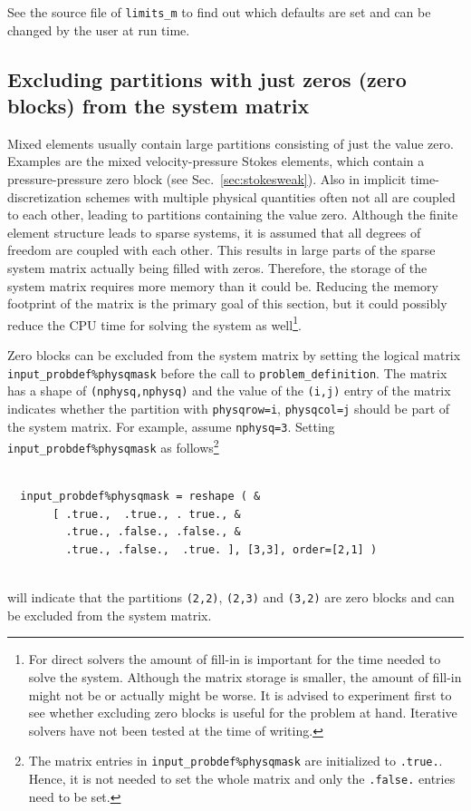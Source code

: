 See the source
file of \texttt{limits\_m} to find out which defaults are set and can be
changed by the user at run time.

\subsection{Excluding partitions with just zeros (zero blocks) from the system matrix}
\label{sec:excludezeroblocks}

Mixed elements usually contain large partitions consisting of just the value zero. Examples are the mixed velocity-pressure Stokes elements, which contain a pressure-pressure zero block (see Sec.~\ref{sec:stokesweak}). Also in implicit time-discretization schemes with multiple physical quantities often not all are coupled to each other, leading to partitions containing the value zero. Although the finite element structure leads to sparse systems, it is assumed that all degrees of freedom are coupled with each other. This results in large parts of the sparse system matrix actually being filled with zeros. Therefore, the storage of the system matrix requires more memory than it could be. Reducing the memory footprint of the matrix is the primary goal of this section, but it could possibly reduce the CPU time for solving the system as well\footnote{For direct solvers the amount of fill-in is important for the time needed to solve the system. Although the matrix storage is smaller, the amount of fill-in might not be or actually might be worse. It is advised to experiment first to see whether excluding zero blocks is useful for the problem at hand. Iterative solvers have not been tested at the time of writing.}.

Zero blocks can be excluded from the system matrix by setting the logical matrix \texttt{input\_probdef\%physqmask}
before the call to \texttt{problem\_definition}. The matrix has a shape of \texttt{(nphysq,nphysq)} and the value of the \texttt{(i,j)} entry of the matrix indicates whether the partition with \texttt{physqrow=i}, \texttt{physqcol=j} should be part of the system matrix. For example, assume \texttt{nphysq=3}. 
Setting \texttt{input\_probdef\%physqmask} as follows\footnote{The matrix entries in \texttt{input\_probdef\%physqmask} are initialized to \texttt{.true.}. Hence, it is not needed to set the whole matrix and only the \texttt{.false.} entries need to be set.}
\begin{verbatim}

  input_probdef%physqmask = reshape ( &
       [ .true.,  .true., . true., &
         .true., .false., .false., &
         .true., .false.,  .true. ], [3,3], order=[2,1] )
         
\end{verbatim}
will indicate that the partitions \texttt{(2,2)}, \texttt{(2,3)} and \texttt{(3,2)} are zero blocks and can be excluded from the system matrix.

